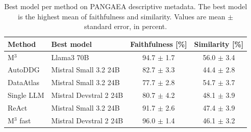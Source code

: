 \begin{table}
\caption{Best model per method on PANGAEA descriptive metadata. The best model is the highest mean of faithfulness and similarity. Values are mean $\pm$ standard error, in percent.}
\label{tab:best_method_descriptive}
\begin{tabular}{llcc}
\toprule
Method & Best model & Faithfulness [\%] & Similarity [\%] \\
\midrule
M$^3$ & Llama3 70B & 94.7 $\pm$ 1.7 & 56.0 $\pm$ 3.4 \\
AutoDDG & Mistral Small 3.2 24B & 82.7 $\pm$ 3.3 & 44.4 $\pm$ 2.8 \\
DataAtlas & Mistral Small 3.2 24B & 77.7 $\pm$ 2.8 & 54.7 $\pm$ 3.7 \\
Single LLM & Mistral Devstral 2 24B & 80.7 $\pm$ 4.2 & 48.1 $\pm$ 3.9 \\
ReAct & Mistral Small 3.2 24B & 91.7 $\pm$ 2.6 & 47.4 $\pm$ 3.9 \\
M$^3$ fast & Mistral Devstral 2 24B & 96.0 $\pm$ 1.4 & 46.1 $\pm$ 3.2 \\
\bottomrule
\end{tabular}
\end{table}
